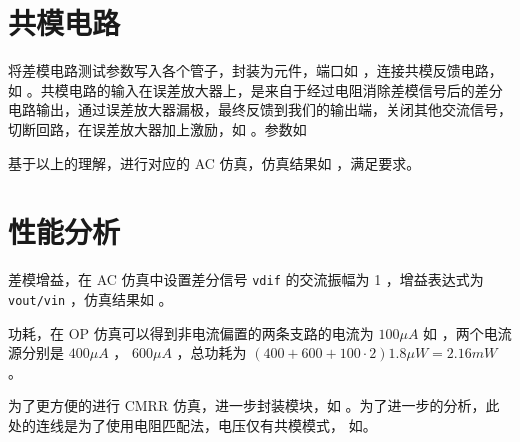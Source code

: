 \documentclass[lang=cn,11pt,a4paper,cite=authoryear]{elegantpaper}
\begin{document}

\section{共模电路}

将差模电路测试参数写入各个管子，封装为元件，端口如  ，连接共模反馈电路，如  。共模电路的输入在误差放大器上，是来自于经过电阻消除差模信号后的差分电路输出，通过误差放大器漏极，最终反馈到我们的输出端，关闭其他交流信号，切断回路，在误差放大器加上激励，如 。参数如 




基于以上的理解，进行对应的 AC 仿真，仿真结果如  ，满足要求。


\section{性能分析}

差模增益，在 AC 仿真中设置差分信号 \lstinline{vdif} 的交流振幅为 1 ，增益表达式为 \lstinline{vout/vin} ，仿真结果如  。


功耗，在 OP 仿真可以得到非电流偏置的两条支路的电流为 \(100 \mu A\) 如 ，两个电流源分别是 \(400\mu A\) ， \(600 \mu A\) ，总功耗为 \((400 + 600 + 100 \cdot 2) 1.8 \mu W = 2.16 mW\) 。


为了更方便的进行 CMRR 仿真，进一步封装模块，如  。为了进一步的分析，此处的连线是为了使用电阻匹配法，电压仅有共模模式， 如。







\end{document}
